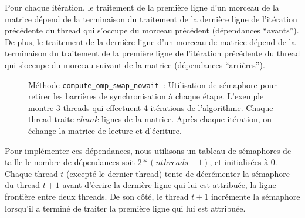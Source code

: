 Pour chaque itération, le traitement de la première ligne d'un morceau
de la matrice dépend de la terminaison du traitement de la dernière
ligne de l'itération précédente du thread qui s'occupe du morceau
précédent (dépendances ``avants''). De plus, le traitement de la
dernière ligne d'un morceau de matrice dépend de la terminaison du
traitement de la première ligne de l'itération précédente du thread
qui s'occupe du morceau suivant de la matrice (dépendances
``arrières'').
\medskip

\begin{figure}[!ht]
  \caption{Méthode \texttt{compute\_omp\_swap\_nowait}~: Utilisation
    de sémaphore pour retirer les barrières de synchronisation à
    chaque étape. L'exemple montre 3 threads qui effectuent 4
    itérations de l'algorithme. Chaque thread traite $chunk$ lignes de
    la matrice. Après chaque itération, on échange la matrice de
    lecture et d'écriture.}
  \label{fig:nowait}
\end{figure}

Pour implémenter ces dépendances, nous utilisons un tableau de
sémaphores de taille le nombre de dépendances soit $2*(nthreads-1)$,
et initialisées à 0. Chaque thread $t$ (excepté le dernier thread)
tente de décrémenter la sémaphore du thread $t+1$ avant d'écrire la
dernière ligne qui lui est attribuée, la ligne frontière entre deux
threads. De son côté, le thread $t+1$ incrémente la sémaphore
lorsqu'il a terminé de traiter la première ligne qui lui est
attribuée.
\medskip

